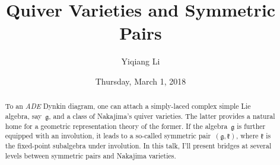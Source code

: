 \documentclass{UAmathtalk}
\author{Yiqiang Li}
\title{Quiver Varieties and Symmetric Pairs}
\date{Thursday, March 1, 2018}
\begin{document}
\maketitle

\begin{abstract}
To an \emph{ADE} Dynkin diagram, one can attach a simply-laced complex simple Lie algebra, say~$\mathfrak{g}$, and a class of Nakajima's quiver varieties.
The latter provides a natural home for a geometric representation theory of the former.
If the algebra~$\mathfrak{g}$ is further equipped with an involution, it leads to a so-called symmetric pair~$(\mathfrak{g},\mathfrak{k})$, where $\mathfrak{k}$ is the fixed-point subalgebra under involution.
In this talk, I’ll present bridges at several levels between symmetric pairs and Nakajima varieties.
\end{abstract}
\end{document}
